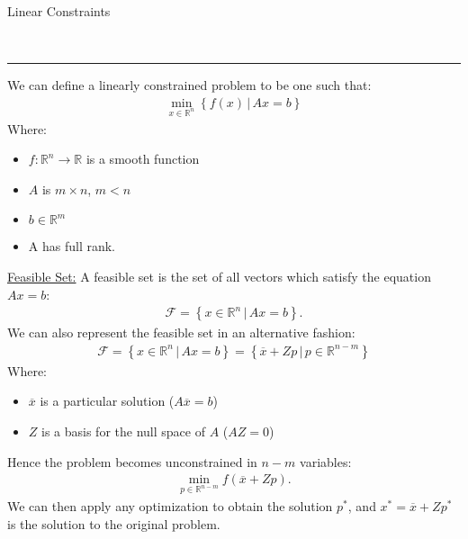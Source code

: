 \documentclass{article}
\newcommand{\header}[1]{\begin{large}\noindent #1\end{large}\\\rule{\textwidth}{0.5pt}}
\newcommand{\sheader}[1]{\underline{#1:}}
\newcommand{\curly}[1]{\left\{#1\right\}}
\begin{document}
\header{Linear Constraints}

We can define a linearly constrained problem to be one such that:
\begin{align*}
    \min_{x \in \mathbb{R}^n} \curly{f(x) \,|\, Ax = b}
\end{align*}
Where:
\begin{itemize}
    \item $f: \mathbb{R}^n \to \mathbb{R}$ is a smooth function
    \item $A$ is $m \times n$, $m < n$
    \item $b \in \mathbb{R}^m$
    \item A has full rank.
\end{itemize}
\sheader{Feasible Set} A feasible set is the set of all vectors which satisfy the equation 
$Ax = b$:
\begin{align*}
    \mathcal{F} = \curly{x \in \mathbb{R}^n \,|\, Ax = b}.
\end{align*}
We can also represent the feasible set in an alternative fashion:
\begin{align*}
    \mathcal{F} = \curly{x \in \mathbb{R}^n \, | \, Ax = b} = \curly{\overline{x} + Zp \,| \, p \in \mathbb{R}^{n - m}}
\end{align*}
Where: \begin{itemize}
    \item $\overline{x}$ is a particular solution ($A\overline{x} = b$)
    \item $Z$ is a basis for the null space of $A$ ($AZ = 0$)
\end{itemize}
Hence the problem becomes unconstrained in $n - m$ variables:
\begin{align*}
    \min_{p \in \mathbb{R}^{n -m}} f(\overline{x} + Zp).
\end{align*}
We can then apply any optimization to obtain the solution $p^*$, and $x^*= \overline{x} + Zp^*$
is the solution to the original problem.
\end{document}
